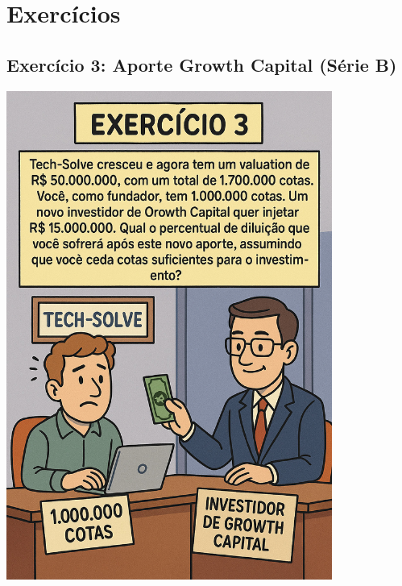 \documentclass[
]{book}
\begin{document}
\section{Exercícios}\label{exercuxedcios-1}

\subsection{\texorpdfstring{\textbf{Exercício 3:} Aporte Growth Capital (Série B)}{Exercício 3: Aporte Growth Capital (Série B)}}\label{exercuxedcio-3-aporte-growth-capital-suxe9rie-b}

\includegraphics[width=4.20833in,height=\textheight]{images/03-2025-08-19_20/exercicio-03.jpg}
\end{document}
